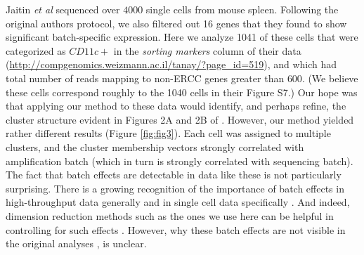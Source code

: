 Jaitin \textit{et al} sequenced over $4000$ single cells from mouse spleen. Following the original authors protocol, we also filtered out 16 genes that they found to show significant batch-specific expression. Here we analyze 1041 of these cells that were categorized as $CD11c+$ in the \textit{sorting markers} column of their data (\url{http://compgenomics.weizmann.ac.il/tanay/?page_id=519}), and which had total number of reads mapping to non-ERCC genes greater than $600$. (We believe these cells correspond roughly to the 1040 cells in their Figure S7.)   Our hope was that applying our method to these data would identify, and perhaps refine, the cluster structure evident in Figures 2A and 2B of \cite{Jaitin2014}. However, our method yielded rather different results (Figure \ref{fig:fig3}). Each cell was assigned to multiple clusters, and the cluster membership vectors strongly correlated with amplification batch (which in turn is strongly correlated with sequencing batch). The fact that batch effects are detectable in data like these is not particularly surprising. There is a growing recognition of the importance of batch effects in high-throughput data generally \cite{Leek2010} and in single cell data specifically \cite{Hicks2015}. And indeed, dimension reduction methods such as the ones we use here can be helpful in controlling for such effects \cite{Leek2007} \cite{Stegle2012}. However, why these batch effects are not visible in the original analyses \cite{Jaitin2014}, is unclear. 




